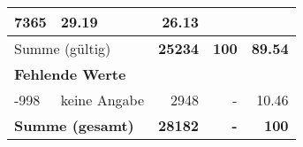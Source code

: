 \begin{longtable}{lXrrr}
       \num{7365} &
       \num[round-mode=places,round-precision=2]{29.19} &
         \num[round-mode=places,round-precision=2]{26.13} \\
     \midrule
     \multicolumn{2}{l}{Summe (gültig)} &
       \textbf{\num{25234}} &
     \textbf{\num{100}} &
       \textbf{\num[round-mode=places,round-precision=2]{89.54}} \\
     \multicolumn{5}{l}{\textbf{Fehlende Werte}}\\
       -998 &
       keine Angabe &
         \num{2948} &
        - &
         \num[round-mode=places,round-precision=2]{10.46} \\
     \midrule
     \multicolumn{2}{l}{\textbf{Summe (gesamt)}} &
          \textbf{\num{28182}} &
        \textbf{-} &
        \textbf{\num{100}} \\
     \bottomrule
     \end{longtable}
     
